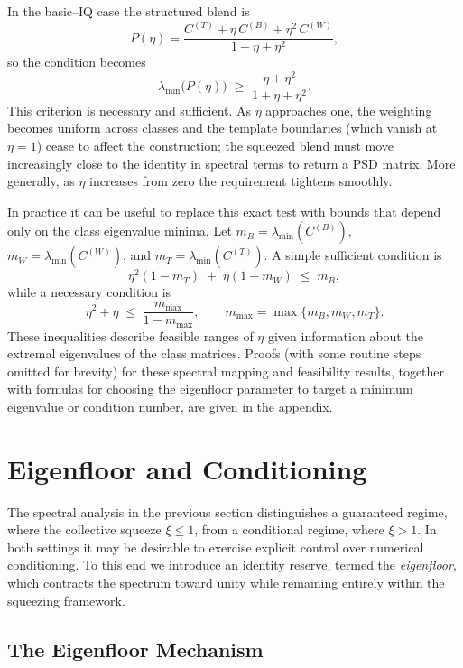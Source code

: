 \documentclass[12pt,letterpaper]{article}
\begin{document}
In the basic–IQ case the structured blend is
\[
P(\eta) = \frac{C^{(T)} + \eta\, C^{(B)} + \eta^{2}\, C^{(W)}}{1+\eta+\eta^{2}},
\]
so the condition becomes
\[
\lambda_{\min}\!\big(P(\eta)\big) \;\geq\; \frac{\eta+\eta^{2}}{1+\eta+\eta^{2}}.
\]
This criterion is necessary and sufficient. As $\eta$ approaches one, the weighting becomes uniform across classes and the template boundaries (which vanish at $\eta=1$) cease to affect the construction; the squeezed blend must move increasingly close to the identity in spectral terms to return a PSD matrix. More generally, as \(\eta\) increases from zero the requirement tightens smoothly.

In practice it can be useful to replace this exact test with bounds that depend only on the class eigenvalue minima. Let \(m_B=\lambda_{\min}(C^{(B)})\), \(m_W=\lambda_{\min}(C^{(W)})\), and \(m_T=\lambda_{\min}(C^{(T)})\). A simple sufficient condition is
\[
\eta^{2}(1-m_T)\;+\;\eta(1-m_W)\;\le\; m_B,
\]
while a necessary condition is
\[
\eta^{2}+\eta \;\le\; \frac{m_{\max}}{1-m_{\max}}, 
\qquad m_{\max}=\max\{m_B,m_W,m_T\}.
\]
These inequalities describe feasible ranges of \(\eta\) given information about the extremal eigenvalues of the class matrices. Proofs (with some routine steps omitted for brevity) for these spectral mapping and feasibility results, together with formulas for choosing the eigenfloor parameter to target a minimum eigenvalue or condition number, are given in the appendix.

\section{Eigenfloor and Conditioning}
\label{sec:eigenfloor}

The spectral analysis in the previous section distinguishes a guaranteed regime, where the collective squeeze \(\xi \le 1\), from a conditional regime, where \(\xi > 1\). In both settings it may be desirable to exercise explicit control over numerical conditioning. To this end we introduce an identity reserve, termed the \emph{eigenfloor}, which contracts the spectrum toward unity while remaining entirely within the squeezing framework.

\subsection{The Eigenfloor Mechanism}
\end{document}
